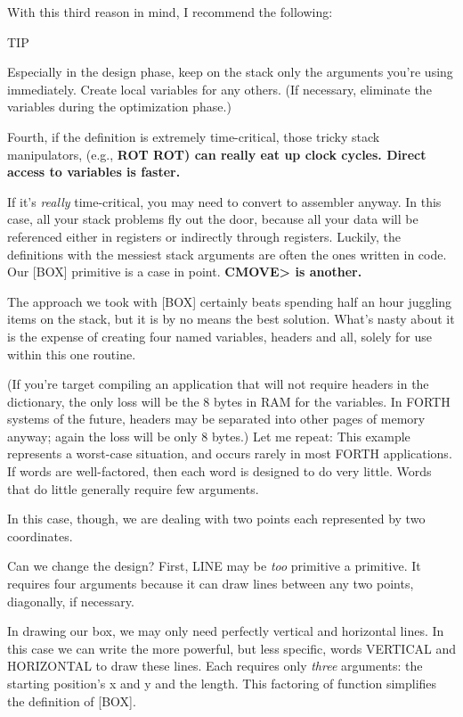 With this third reason in mind, I recommend the following:

TIP

Especially in the design phase, keep on the stack only the arguments you're
using immediately. Create local variables for any others. (If necessary,
eliminate the variables during the optimization phase.)

Fourth, if the definition is extremely time-critical, those tricky stack
manipulators, (e.g., \bf{ROT ROT}) can really eat up clock cycles. Direct
access to variables is faster.

If it's \emph{really} time-critical, you may need to convert to assembler
anyway. In this case, all your stack problems fly out the door, because all
your data will be referenced either in registers or indirectly through
registers. Luckily, the definitions with the messiest stack arguments are
often the ones written in code. Our [BOX] primitive is a case in point.
\bf{CMOVE>} is another.

The approach we took with [BOX] certainly beats spending half an
hour juggling items on the stack, but it is by no means the best solution.
What's nasty about it is the expense of creating four named variables,
headers and all, solely for use within this one routine.

(If you're target compiling an application that will not require
headers in the dictionary, the only loss will be the 8 bytes in RAM for the
variables. In FORTH systems of the future, headers may be separated
into other pages of memory anyway; again the loss will be only 8 bytes.)
Let me repeat: This example represents a worst-case situation, and
occurs rarely in most FORTH applications. If words are well-factored,
then each word is designed to do very little. Words that do little generally
require few arguments.

In this case, though, we are dealing with two points each represented
by two coordinates.

Can we change the design? First, LINE may be \emph{too} primitive a
primitive. It requires four arguments because it can draw lines between
any two points, diagonally, if necessary.

In drawing our box, we may only need perfectly vertical and horizontal
lines. In this case we can write the more powerful, but less specific,
words VERTICAL and HORIZONTAL to draw these lines. Each requires
only \emph{three} arguments: the starting position's x and y and the
length. This factoring of function simplifies the definition of [BOX].

